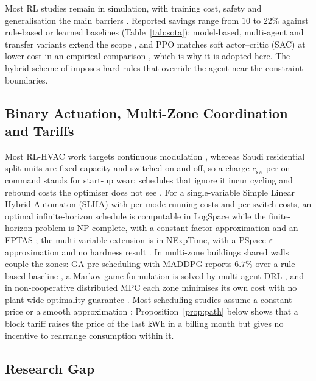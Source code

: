 \documentclass[pdflatex,sn-mathphys-num,iicol]{sn-jnl}
\theoremstyle{thmstyleone}\newtheorem{proposition}{Proposition}\newtheorem{corollary}{Corollary}
\theoremstyle{thmstyletwo}\newtheorem{remark}{Remark}\newtheorem{observation}{Observation}
\theoremstyle{thmstylethree}\newtheorem{definition}{Definition}
\newcommand{\csw}{c_{\mathrm{sw}}}
\begin{document}
Most RL studies remain in simulation, with training cost, safety and generalisation the main barriers \citep{WangHong2020}. Reported savings range from $10$ to $22\%$ against rule-based or learned baselines \citep{Azuatalam2020,Biemann2021,Du2021b,Du2021a} (Table~\ref{tab:sota}); model-based, multi-agent and transfer variants extend the scope \citep{Ding2024,Liu2024,Hou2024}, and PPO matches soft actor--critic (SAC) at lower cost in an empirical comparison \citep{Manjavacas2024}, which is why it is adopted here. The hybrid scheme of \citep{Xu2025} imposes hard rules that override the agent near the constraint boundaries.

\subsection{Binary Actuation, Multi-Zone Coordination and Tariffs}

Most RL-HVAC work targets continuous modulation \citep{Wang2024DRL}, whereas Saudi residential split units are fixed-capacity and switched on and off, so a charge $\csw$ per on-command stands for start-up wear; schedules that ignore it incur cycling and rebound costs the optimiser does not see \citep{Faddel2023}. For a single-variable Simple Linear Hybrid Automaton (SLHA) with per-mode running costs and per-switch costs, an optimal infinite-horizon schedule is computable in LogSpace while the finite-horizon problem is NP-complete, with a constant-factor approximation and an FPTAS \citep{Mousa2016}; the multi-variable extension is in NExpTime, with a PSpace $\varepsilon$-approximation and no hardness result \citep{Mousa2017}. In multi-zone buildings shared walls couple the zones: GA pre-scheduling with MADDPG reports $6.7\%$ over a rule-based baseline \citep{Xue2025}, a Markov-game formulation is solved by multi-agent DRL \citep{Yu2021}, and in non-cooperative distributed MPC each zone minimises its own cost with no plant-wide optimality guarantee \citep{Scattolini2009}. Most scheduling studies assume a constant price \citep{ElMakroum2023} or a smooth approximation \citep{Risbeck2017}; Proposition~\ref{prop:path} below shows that a block tariff raises the price of the last kWh in a billing month but gives no incentive to rearrange consumption within it.

\subsection{Research Gap}
\label{subsec:gap}
 
\end{document}
